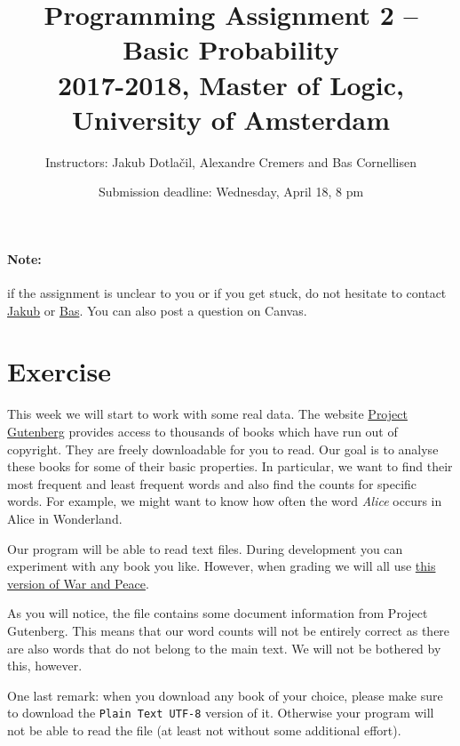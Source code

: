 \documentclass[11pt, a4paper]{article}
\title{Programming Assignment 2 -- Basic Probability \\[2mm]
\large{2017-2018, Master of Logic, University of Amsterdam}}
\author{Instructors: Jakub Dotla\v{c}il, Alexandre Cremers and Bas Cornellisen}
\date{Submission deadline: Wednesday, April 18, 8 pm}
\begin{document}
\maketitle

\paragraph{Note:} if the assignment is unclear to you or if you get stuck, do not hesitate to contact \href{mailto:j.dotlacil@uva.nl}{Jakub} or \href{mailto:bjmcornelissen@gmail.com}{Bas}. You can also post a question on Canvas.

\section{Exercise}
This week we will start to work with some real data. The website \href{https://www.gutenberg.org/}{Project Gutenberg} provides access to thousands of
books which have run out of copyright. They are freely downloadable for you to read. Our goal is to analyse these books for some of their basic 
properties. In particular, we want to find their most frequent and least frequent words and also find the counts for specific words. For example,
we might want to know how often the word \textit{Alice} occurs in Alice in Wonderland.

Our program will be able to read text files. During development you can experiment
with any book you like. However, when grading we will all use \href{https://www.gutenberg.org/cache/epub/2600/pg2600.txt}{this version of War and Peace}.

As you will notice, the file contains some document information from Project Gutenberg. This means that our word counts will not be entirely correct as
there are also words that do not belong to the main text. We will not be bothered by this, however.

One last remark: when you download any book of your choice, please make sure to download the \texttt{Plain Text UTF-8} version of it. Otherwise your
program will not be able to read the file (at least not without some additional effort).
\end{document}
